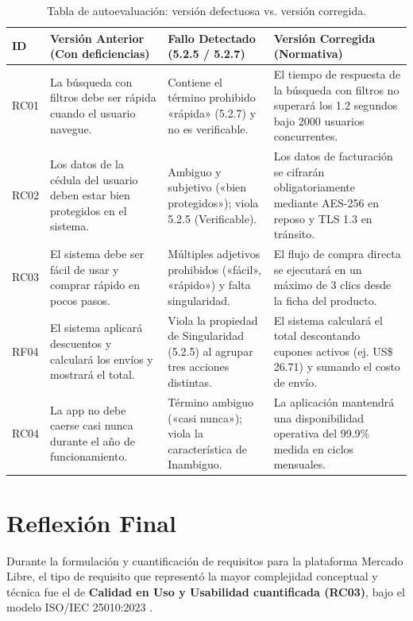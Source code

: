 \documentclass[11pt, a4paper]{article}
\begin{document}
\begin{table}[h!]
\small
\centering
\begin{tabularx}{\textwidth}{l X X X}
\toprule
\textbf{ID} & \textbf{Versión Anterior (Con deficiencias)} & \textbf{Fallo Detectado (5.2.5 / 5.2.7)} & \textbf{Versión Corregida (Normativa)} \\
\midrule
RC01 & La búsqueda con filtros debe ser rápida cuando el usuario navegue. & Contiene el término prohibido «rápida» (5.2.7) y no es verificable. & El tiempo de respuesta de la búsqueda con filtros no superará los 1.2 segundos bajo 2000 usuarios concurrentes. \\
RC02 & Los datos de la cédula del usuario deben estar bien protegidos en el sistema. & Ambiguo y subjetivo («bien protegidos»); viola 5.2.5 (Verificable). & Los datos de facturación se cifrarán obligatoriamente mediante AES-256 en reposo y TLS 1.3 en tránsito. \\
RC03 & El sistema debe ser fácil de usar y comprar rápido en pocos pasos. & Múltiples adjetivos prohibidos («fácil», «rápido») y falta singularidad. & El flujo de compra directa se ejecutará en un máximo de 3 clics desde la ficha del producto. \\
RF04 & El sistema aplicará descuentos y calculará los envíos y mostrará el total. & Viola la propiedad de Singularidad (5.2.5) al agrupar tres acciones distintas. & El sistema calculará el total descontando cupones activos (ej. US\$ 26.71) y sumando el costo de envío. \\
RC04 & La app no debe caerse casi nunca durante el año de funcionamiento. & Término ambiguo («casi nunca»); viola la característica de Inambiguo. & La aplicación mantendrá una disponibilidad operativa del 99.9\% medida en ciclos mensuales. \\
\bottomrule
\end{tabularx}
\caption{Tabla de autoevaluación: versión defectuosa vs. versión corregida.}
\label{tab:autoevaluacion}
\end{table}

\section{Reflexión Final}

Durante la formulación y cuantificación de requisitos para la plataforma Mercado Libre, el tipo de requisito que representó la mayor complejidad conceptual y técnica fue el de \textbf{Calidad en Uso y Usabilidad cuantificada (RC03)}, bajo el modelo ISO/IEC 25010:2023 \cite{iso25010}. 
\end{document}
